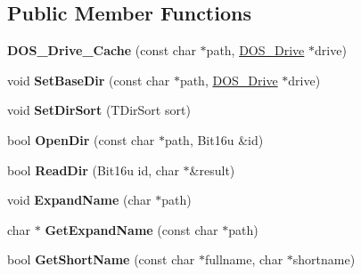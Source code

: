\subsection*{Public Member Functions}
\begin{DoxyCompactItemize}
\item 
\hypertarget{classDOS__Drive__Cache_a1d2b613312882771a0849446eff0e5f5}{{\bfseries D\-O\-S\-\_\-\-Drive\-\_\-\-Cache} (const char $\ast$path, \hyperlink{classDOS__Drive}{D\-O\-S\-\_\-\-Drive} $\ast$drive)}\label{classDOS__Drive__Cache_a1d2b613312882771a0849446eff0e5f5}

\item 
\hypertarget{classDOS__Drive__Cache_a8ed60a9683170b1c7eb36e31c31fa2bd}{void {\bfseries Set\-Base\-Dir} (const char $\ast$path, \hyperlink{classDOS__Drive}{D\-O\-S\-\_\-\-Drive} $\ast$drive)}\label{classDOS__Drive__Cache_a8ed60a9683170b1c7eb36e31c31fa2bd}

\item 
\hypertarget{classDOS__Drive__Cache_ac49b22a5b034eb6a9e029f2dce0f4773}{void {\bfseries Set\-Dir\-Sort} (T\-Dir\-Sort sort)}\label{classDOS__Drive__Cache_ac49b22a5b034eb6a9e029f2dce0f4773}

\item 
\hypertarget{classDOS__Drive__Cache_a85aec9a4d7d87913806fa98c96dd2b68}{bool {\bfseries Open\-Dir} (const char $\ast$path, Bit16u \&id)}\label{classDOS__Drive__Cache_a85aec9a4d7d87913806fa98c96dd2b68}

\item 
\hypertarget{classDOS__Drive__Cache_aa3d88abf30778f5cd2f50c17b461a9dc}{bool {\bfseries Read\-Dir} (Bit16u id, char $\ast$\&result)}\label{classDOS__Drive__Cache_aa3d88abf30778f5cd2f50c17b461a9dc}

\item 
\hypertarget{classDOS__Drive__Cache_a21a3d68ddb91cf0c8ef5aaa4dc088271}{void {\bfseries Expand\-Name} (char $\ast$path)}\label{classDOS__Drive__Cache_a21a3d68ddb91cf0c8ef5aaa4dc088271}

\item 
\hypertarget{classDOS__Drive__Cache_ab7f5a37051054c0596d7844387e5ca3b}{char $\ast$ {\bfseries Get\-Expand\-Name} (const char $\ast$path)}\label{classDOS__Drive__Cache_ab7f5a37051054c0596d7844387e5ca3b}

\item 
\hypertarget{classDOS__Drive__Cache_ae829119eadbb14de58f18339600e81ee}{bool {\bfseries Get\-Short\-Name} (const char $\ast$fullname, char $\ast$shortname)}\label{classDOS__Drive__Cache_ae829119eadbb14de58f18339600e81ee}


\end{DoxyCompactItemize}
